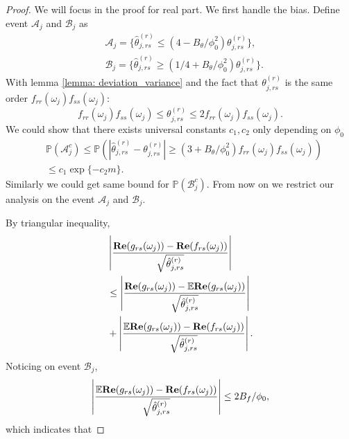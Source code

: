 \begin{proof}
We will focus in the proof for  real part. We first handle the bias. 
Define event $\mathcal{A}_j$ and $\mathcal{B}_j$ as 
\begin{equation}
\begin{aligned}
& \mathcal{A}_j = \{\hat{\theta}^{(r)}_{j, rs}\le (4 - B_\theta/\phi_0^2) \theta^{(r)}_{j,rs} \},\\
& \mathcal{B}_j = \{\hat{\theta}^{(r)}_{j, rs}\ge (1/4 + B_\theta/\phi_0^2) \theta^{(r)}_{j, rs} \}.
\end{aligned}
\end{equation}
With lemma \ref{lemma: deviation_variance} and the fact that $\theta^{(r)}_{j, rs}$ is the same order $f_{rr}(\omega_j)f_{ss}(\omega_j)$:
\begin{equation}
f_{rr}(\omega_j)f_{ss}(\omega_j)\le \theta^{(r)}_{j, rs}\le  2f_{rr}(\omega_j)f_{ss}(\omega_j). 
\end{equation}
We could show that there exists universal constants $c_1, c_2$ only depending on $\phi_0$
\begin{equation}
\begin{aligned}
&\mathbb{P} (\mathcal{A}_j^c) \le \mathbb{P}\left(|\hat{\theta}^{(r)}_{j, rs} - \theta^{(r)}_{j, rs}|\ge (3 +B_\theta/\phi_0^2 )f_{rr}(\omega_j)f_{ss}(\omega_j)\right)\\
& \le c_1\exp\{-c_2m\}.
\end{aligned}
\end{equation}
Similarly we could get same bound for $\mathbb{P}(\mathcal{B}_j^c)$. From now on we restrict our analysis on the event $\mathcal{A}_j$ and $\mathcal{B}_j$. \par 
By triangular inequality,  
\begin{equation}
\begin{aligned}
& \left|\frac{{\bf Re}(g_{rs}(\omega_j)) - {\bf Re}(f_{rs}(\omega_j))}{\sqrt{\hat{\theta}^{(r)}_{j,rs}}}\right| \\
& \le \left|\frac{{\bf Re}(g_{rs}(\omega_j)) - \mathbb{E} {\bf Re}(g_{rs}(\omega_j))}{\sqrt{\hat{\theta}^{(r)}_{j,rs}}}\right|\\
& +  \left|\frac{\mathbb{E} {\bf Re}(g_{rs}(\omega_j)) -{\bf Re}(f_{rs}(\omega_j))}{\sqrt{\hat{\theta}^{(r)}_{j,rs}}}\right|. 
\end{aligned}
\end{equation}
Noticing on event $\mathcal{B}_j$, 
\begin{equation}
 \left|\frac{\mathbb{E} {\bf Re}(g_{rs}(\omega_j)) -{\bf Re}(f_{rs}(\omega_j))}{\sqrt{\hat{\theta}^{(r)}_{j,rs}}}\right|\le 2B_f/\phi_0,
\end{equation}
which indicates that 


\end{proof}
